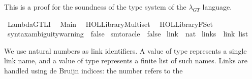 %
\begin{isabellebody}%
%
%
\isadelimdocument
%
\endisadelimdocument
%
\isatagdocument
%
\isamarkuptrue%
%
\endisatagdocument
{\isafolddocument}%
%
\isadelimdocument
%
\endisadelimdocument
%
\begin{isamarkuptext}%
This is a proof for the soundness of the type system of the $\lambda_{GT}$ language.%
\end{isamarkuptext}\isamarkuptrue%
%
\isadelimtheory
%
\endisadelimtheory
%
\isatagtheory
{}\isamarkupfalse%
\ LambdaGT{\isacharunderscore}{\kern0pt}LI\isanewline
{}\isanewline
\ \ Main\isanewline
\ \ {\isachardoublequoteopen}HOL{\isacharminus}{\kern0pt}Library{\isachardot}{\kern0pt}Multiset{\isachardoublequoteclose}\isanewline
\ \ {\isachardoublequoteopen}HOL{\isacharminus}{\kern0pt}Library{\isachardot}{\kern0pt}FSet{\isachardoublequoteclose}\isanewline
{}%
\endisatagtheory
{\isafoldtheory}%
%
\isadelimtheory
%
\endisadelimtheory
\isanewline
\isanewline
{}\isamarkupfalse%
\ {\isacharbrackleft}{\kern0pt}{\isacharbrackleft}{\kern0pt}syntax{\isacharunderscore}{\kern0pt}ambiguity{\isacharunderscore}{\kern0pt}warning\ {\isacharequal}{\kern0pt}\ false{\isacharbrackright}{\kern0pt}{\isacharbrackright}{\kern0pt}\isanewline
{}\isamarkupfalse%
\ {\isacharbrackleft}{\kern0pt}{\isacharbrackleft}{\kern0pt}smt{\isacharunderscore}{\kern0pt}oracle\ {\isacharequal}{\kern0pt}\ false{\isacharbrackright}{\kern0pt}{\isacharbrackright}{\kern0pt}%
\isadelimdocument
%
\endisadelimdocument
%
\isatagdocument
%
\isamarkuptrue%
%
\isamarkuptrue%
%
\endisatagdocument
{\isafolddocument}%
%
\isadelimdocument
%
\endisadelimdocument
{}\isamarkupfalse%
\ link\ {\isacharequal}{\kern0pt}\ nat\isanewline
{}\isamarkupfalse%
\ links\ {\isacharequal}{\kern0pt}\ {\isachardoublequoteopen}link\ list{\isachardoublequoteclose}%
\begin{isamarkuptext}%
We use natural numbers as link identifiers.
A value of type  represents a single link name,
and a value of type  represents a finite list of such names.
Links are handled using de Bruijn indices: the number  refers to the

\end{isamarkuptext}
\end{isabellebody}
